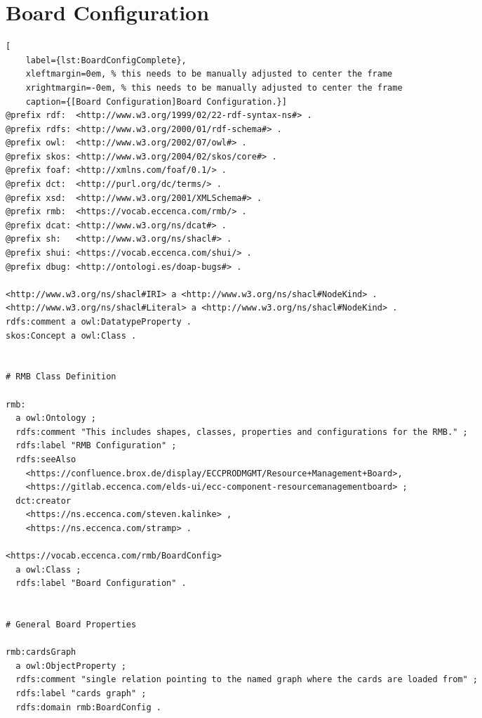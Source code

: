 
\section*{Board Configuration}

\begin{spacing}{0.9}
    \lstset{language=N3,escapechar=|,numbers=none}
    \begin{lstlisting}[
    label={lst:BoardConfigComplete},
    xleftmargin=0em, % this needs to be manually adjusted to center the frame
    xrightmargin=-0em, % this needs to be manually adjusted to center the frame
    caption={[Board Configuration]Board Configuration.}]
@prefix rdf:  <http://www.w3.org/1999/02/22-rdf-syntax-ns#> .
@prefix rdfs: <http://www.w3.org/2000/01/rdf-schema#> .
@prefix owl:  <http://www.w3.org/2002/07/owl#> .
@prefix skos: <http://www.w3.org/2004/02/skos/core#> .
@prefix foaf: <http://xmlns.com/foaf/0.1/> .
@prefix dct:  <http://purl.org/dc/terms/> .
@prefix xsd:  <http://www.w3.org/2001/XMLSchema#> .
@prefix rmb:  <https://vocab.eccenca.com/rmb/> .
@prefix dcat: <http://www.w3.org/ns/dcat#> .
@prefix sh:   <http://www.w3.org/ns/shacl#> .
@prefix shui: <https://vocab.eccenca.com/shui/> .
@prefix dbug: <http://ontologi.es/doap-bugs#> .

<http://www.w3.org/ns/shacl#IRI> a <http://www.w3.org/ns/shacl#NodeKind> .
<http://www.w3.org/ns/shacl#Literal> a <http://www.w3.org/ns/shacl#NodeKind> .
rdfs:comment a owl:DatatypeProperty .
skos:Concept a owl:Class .


# RMB Class Definition

rmb:
  a owl:Ontology ;
  rdfs:comment "This includes shapes, classes, properties and configurations for the RMB." ;
  rdfs:label "RMB Configuration" ;
  rdfs:seeAlso
    <https://confluence.brox.de/display/ECCPRODMGMT/Resource+Management+Board>,
    <https://gitlab.eccenca.com/elds-ui/ecc-component-resourcemanagementboard> ;
  dct:creator
    <https://ns.eccenca.com/steven.kalinke> ,
    <https://ns.eccenca.com/stramp> .

<https://vocab.eccenca.com/rmb/BoardConfig>
  a owl:Class ;
  rdfs:label "Board Configuration" .
  
 
# General Board Properties 

rmb:cardsGraph
  a owl:ObjectProperty ;
  rdfs:comment "single relation pointing to the named graph where the cards are loaded from" ;
  rdfs:label "cards graph" ;
  rdfs:domain rmb:BoardConfig .


\end{lstlisting}
\end{spacing}
